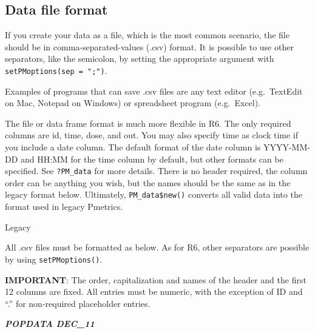 \documentclass[
]{book}
\begin{document}
\hypertarget{data-file-format}{%
\subsection{Data file format}\label{data-file-format}}

If you create your data as a file, which is the most
common scenario, the file should be in comma-separated-values (.csv) format. It is possible
to use other separators, like the semicolon, by setting the appropriate argument with \texttt{setPMoptions(sep\ =\ ";")}.

Examples of programs
that can save .csv files are any text editor (e.g.~TextEdit on Mac,
Notepad on Windows) or spreadsheet program (e.g.~Excel).

The file or data frame format is much more flexible in R6. The only required columns are id, time, dose, and out. You may also specify time as clock time if you include a date column. The default format of the date column is YYYY-MM-DD and HH:MM for the time column by default, but other formats can be specified. See \texttt{?PM\_data} for more details. There is no header required, the column order can be anything you wish, but the names should be the same as in the legacy format below. Ultimately, \texttt{PM\_data\$new()} converts all valid data into the format used in legacy Pmetrics.

{Legacy}

All .csv files must be formatted as below. As for R6, other separators are possible by using \texttt{setPMoptions()}.

\textbf{IMPORTANT}: The order, capitalization and names of the header and the
first 12 columns are fixed. All entries must be numeric, with the
exception of ID and ``.'' for non-required placeholder entries.

\textbf{\emph{POPDATA DEC\_11}}
\end{document}
